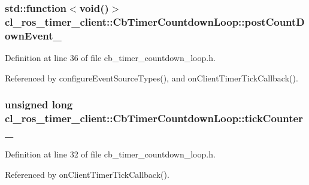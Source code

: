 \subsubsection[{\texorpdfstring{post\+Count\+Down\+Event\+\_\+}{postCountDownEvent_}}]{\setlength{\rightskip}{0pt plus 5cm}std\+::function$<$void()$>$ cl\+\_\+ros\+\_\+timer\+\_\+client\+::\+Cb\+Timer\+Countdown\+Loop\+::post\+Count\+Down\+Event\+\_\+\hspace{0.3cm}{\ttfamily [private]}}\hypertarget{classcl__ros__timer__client_1_1CbTimerCountdownLoop_aacb5caea198526bfd54f49d5020fe33d}{}\label{classcl__ros__timer__client_1_1CbTimerCountdownLoop_aacb5caea198526bfd54f49d5020fe33d}


Definition at line 36 of file cb\+\_\+timer\+\_\+countdown\+\_\+loop.\+h.



Referenced by configure\+Event\+Source\+Types(), and on\+Client\+Timer\+Tick\+Callback().

\subsubsection[{\texorpdfstring{tick\+Counter\+\_\+}{tickCounter_}}]{\setlength{\rightskip}{0pt plus 5cm}unsigned long cl\+\_\+ros\+\_\+timer\+\_\+client\+::\+Cb\+Timer\+Countdown\+Loop\+::tick\+Counter\+\_\+\hspace{0.3cm}{\ttfamily [private]}}\hypertarget{classcl__ros__timer__client_1_1CbTimerCountdownLoop_a70f9ec04cd4d3f55d3f785f7ddb5d049}{}\label{classcl__ros__timer__client_1_1CbTimerCountdownLoop_a70f9ec04cd4d3f55d3f785f7ddb5d049}


Definition at line 32 of file cb\+\_\+timer\+\_\+countdown\+\_\+loop.\+h.



Referenced by on\+Client\+Timer\+Tick\+Callback().

